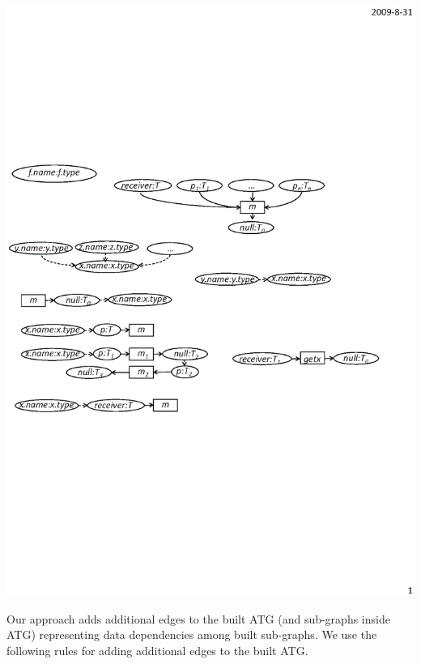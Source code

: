 \begin{enumerate}
\begin{center}
\includegraphics[scale=0.7,clip]{figure/rule3.eps}%
\end{center}

\end{enumerate}

Our approach adds additional edges to the built ATG (and sub-graphs inside ATG) 
representing data dependencies among built sub-graphs. We use the following rules
for adding additional edges to the built ATG.

